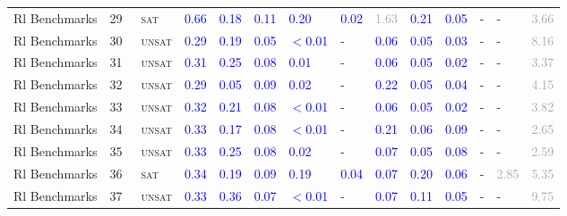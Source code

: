 \begin{center}
{\begin{longtable}{@{}llllllllllllll@{}}
Rl Benchmarks & 29 & ~\textsc{sat} & \textcolor{blue}{0.66} & \textcolor{blue}{0.18} & \textcolor{blue}{0.11} & \textcolor{blue}{0.20} & \textcolor{blue}{0.02} & \textcolor{darkgray}{1.63} & \textcolor{blue}{0.21} & \textcolor{blue}{0.05} & - & - & \textcolor{darkgray}{3.66} \\
Rl Benchmarks & 30 & ~\textsc{unsat} & \textcolor{blue}{0.29} & \textcolor{blue}{0.19} & \textcolor{blue}{0.05} & \textcolor{blue}{$<$0.01} & - & \textcolor{blue}{0.06} & \textcolor{blue}{0.05} & \textcolor{blue}{0.03} & - & - & \textcolor{darkgray}{8.16} \\
Rl Benchmarks & 31 & ~\textsc{unsat} & \textcolor{blue}{0.31} & \textcolor{blue}{0.25} & \textcolor{blue}{0.08} & \textcolor{blue}{0.01} & - & \textcolor{blue}{0.06} & \textcolor{blue}{0.05} & \textcolor{blue}{0.02} & - & - & \textcolor{darkgray}{3.37} \\
Rl Benchmarks & 32 & ~\textsc{unsat} & \textcolor{blue}{0.29} & \textcolor{blue}{0.05} & \textcolor{blue}{0.09} & \textcolor{blue}{0.02} & - & \textcolor{blue}{0.22} & \textcolor{blue}{0.05} & \textcolor{blue}{0.04} & - & - & \textcolor{darkgray}{4.15} \\
Rl Benchmarks & 33 & ~\textsc{unsat} & \textcolor{blue}{0.32} & \textcolor{blue}{0.21} & \textcolor{blue}{0.08} & \textcolor{blue}{$<$0.01} & - & \textcolor{blue}{0.06} & \textcolor{blue}{0.05} & \textcolor{blue}{0.02} & - & - & \textcolor{darkgray}{3.82} \\
Rl Benchmarks & 34 & ~\textsc{unsat} & \textcolor{blue}{0.33} & \textcolor{blue}{0.17} & \textcolor{blue}{0.08} & \textcolor{blue}{$<$0.01} & - & \textcolor{blue}{0.21} & \textcolor{blue}{0.06} & \textcolor{blue}{0.09} & - & - & \textcolor{darkgray}{2.65} \\
Rl Benchmarks & 35 & ~\textsc{unsat} & \textcolor{blue}{0.33} & \textcolor{blue}{0.25} & \textcolor{blue}{0.08} & \textcolor{blue}{0.02} & - & \textcolor{blue}{0.07} & \textcolor{blue}{0.05} & \textcolor{blue}{0.08} & - & - & \textcolor{darkgray}{2.59} \\
Rl Benchmarks & 36 & ~\textsc{sat} & \textcolor{blue}{0.34} & \textcolor{blue}{0.19} & \textcolor{blue}{0.09} & \textcolor{blue}{0.19} & \textcolor{blue}{0.04} & \textcolor{blue}{0.07} & \textcolor{blue}{0.20} & \textcolor{blue}{0.06} & - & \textcolor{darkgray}{2.85} & \textcolor{darkgray}{5.35} \\
Rl Benchmarks & 37 & ~\textsc{unsat} & \textcolor{blue}{0.33} & \textcolor{blue}{0.36} & \textcolor{blue}{0.07} & \textcolor{blue}{$<$0.01} & - & \textcolor{blue}{0.07} & \textcolor{blue}{0.11} & \textcolor{blue}{0.05} & - & - & \textcolor{darkgray}{9.75} \\

\end{longtable}}
\end{center}
